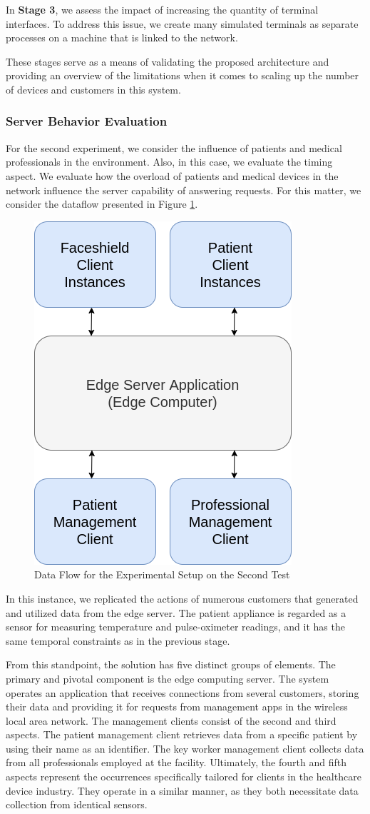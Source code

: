 In \textbf{Stage 3}, we assess the impact of increasing the quantity of terminal interfaces. To address this issue, we create many simulated terminals as separate processes on a machine that is linked to the network.

These stages serve as a means of validating the proposed architecture and providing an overview of the limitations when it comes to scaling up the number of devices and customers in this system.

\subsubsection{Server Behavior Evaluation}

For the second experiment, we consider the influence of patients and medical professionals in the environment. Also, in this case, we evaluate the timing aspect. We evaluate how the overload of patients and medical devices in the network influence the server capability of answering requests. For this matter, we consider the dataflow presented in Figure \ref{fig:xpsetup}.

\begin{figure}[h!]
    \centering
    \includegraphics[width = .35\linewidth]{Figures/experimental-setup.png}    \caption{Data Flow for the Experimental Setup on the Second Test}
    \label{fig:xpsetup}
\end{figure}

In this instance, we replicated the actions of numerous customers that generated and utilized data from the edge server. The patient appliance is regarded as a sensor for measuring temperature and pulse-oximeter readings, and it has the same temporal constraints as in the previous stage.

From this standpoint, the solution has five distinct groups of elements. The primary and pivotal component is the edge computing server. The system operates an application that receives connections from several customers, storing their data and providing it for requests from management apps in the wireless local area network. The management clients consist of the second and third aspects. The patient management client retrieves data from a specific patient by using their name as an identifier. The key worker management client collects data from all professionals employed at the facility. Ultimately, the fourth and fifth aspects represent the occurrences specifically tailored for clients in the healthcare device industry. They operate in a similar manner, as they both necessitate data collection from identical sensors.


